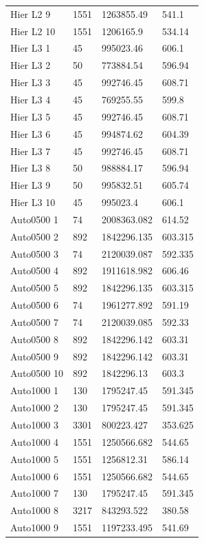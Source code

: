 \documentclass{svmult}
\begin{document}
\begin{small}
\begin{longtable}{p{2.3cm}p{1.5cm}p{2cm}p{1.3cm}}
    Hier L2 9 & 1551 & 1263855.49 & 541.1 \\
    Hier L2 10 & 1551 & 1206165.9 & 534.14 \\
    \hline
    Hier L3 1 & 45 & 995023.46 & 606.1 \\
    Hier L3 2 & 50 & 773884.54 & 596.94 \\
    Hier L3 3 & 45 & 992746.45 & 608.71 \\
    Hier L3 4 & 45 & 769255.55 & 599.8 \\
    Hier L3 5 & 45 & 992746.45 & 608.71 \\
    Hier L3 6 & 45 & 994874.62 & 604.39 \\
    Hier L3 7 & 45 & 992746.45 & 608.71 \\
    Hier L3 8 & 50 & 988884.17 & 596.94 \\
    Hier L3 9 & 50 & 995832.51 & 605.74 \\
    Hier L3 10 & 45 & 995023.4 & 606.1 \\
    \hline
    Auto0500 1 & 74 & 2008363.082 & 614.52 \\
    Auto0500 2 & 892 & 1842296.135 & 603.315 \\
    Auto0500 3 & 74 & 2120039.087 & 592.335 \\
    Auto0500 4 & 892 & 1911618.982 & 606.46 \\
    Auto0500 5 & 892 & 1842296.135 & 603.315 \\
    Auto0500 6 & 74 & 1961277.892 & 591.19 \\
    Auto0500 7 & 74 & 2120039.085 & 592.33 \\
    Auto0500 8 & 892 & 1842296.142 & 603.31 \\
    Auto0500 9 & 892 & 1842296.142 & 603.31 \\
    Auto0500 10 & 892 & 1842296.13 & 603.3 \\
    \hline
    Auto1000 1 & 130 & 1795247.45 & 591.345 \\
    Auto1000 2 & 130 & 1795247.45 & 591.345 \\
    Auto1000 3 & 3301 & 800223.427 & 353.625 \\
    Auto1000 4 & 1551 & 1250566.682 & 544.65 \\
    Auto1000 5 & 1551 & 1256812.31 & 586.14 \\
    Auto1000 6 & 1551 & 1250566.682 & 544.65 \\
    Auto1000 7 & 130 & 1795247.45 & 591.345 \\
    Auto1000 8 & 3217 & 843293.522 & 380.58 \\
    Auto1000 9 & 1551 & 1197233.495 & 541.69 \\

\end{longtable}
\end{small}
\end{document}
